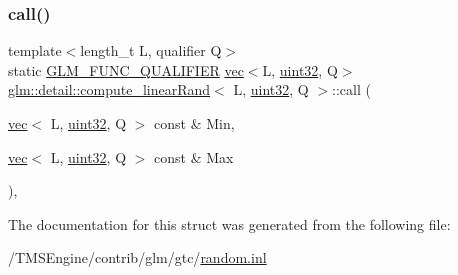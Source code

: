 \subsubsection{\texorpdfstring{call()}{call()}}
{\footnotesize\ttfamily template$<$length\+\_\+t L, qualifier Q$>$ \\
static \hyperlink{setup_8hpp_a33fdea6f91c5f834105f7415e2a64407}{G\+L\+M\+\_\+\+F\+U\+N\+C\+\_\+\+Q\+U\+A\+L\+I\+F\+I\+ER} \hyperlink{structglm_1_1vec}{vec}$<$L, \hyperlink{namespaceglm_1_1detail_ade6cfbf377022aaa391af8cd50489222}{uint32}, Q$>$ \hyperlink{structglm_1_1detail_1_1compute__linear_rand}{glm\+::detail\+::compute\+\_\+linear\+Rand}$<$ L, \hyperlink{namespaceglm_1_1detail_ade6cfbf377022aaa391af8cd50489222}{uint32}, Q $>$\+::call (\begin{DoxyParamCaption}\item[{\hyperlink{structglm_1_1vec}{vec}$<$ L, \hyperlink{namespaceglm_1_1detail_ade6cfbf377022aaa391af8cd50489222}{uint32}, Q $>$ const \&}]{Min,  }\item[{\hyperlink{structglm_1_1vec}{vec}$<$ L, \hyperlink{namespaceglm_1_1detail_ade6cfbf377022aaa391af8cd50489222}{uint32}, Q $>$ const \&}]{Max }\end{DoxyParamCaption})\hspace{0.3cm}{\ttfamily [inline]}, {\ttfamily [static]}}



The documentation for this struct was generated from the following file\+:\begin{DoxyCompactItemize}
\item 
/\+T\+M\+S\+Engine/contrib/glm/gtc/\hyperlink{random_8inl}{random.\+inl}\end{DoxyCompactItemize}
